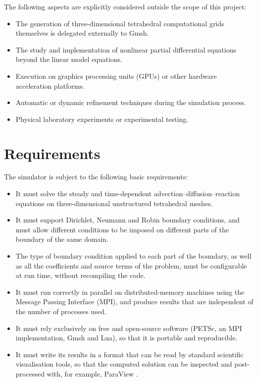 \documentclass[GREVA,english,openany]{tfe-eseiaat}
\begin{document}
The following aspects are explicitly considered outside the scope of this project:

\begin{itemize}
    \item The generation of three-dimensional tetrahedral computational grids themselves is delegated externally to Gmsh.
    \item The study and implementation of nonlinear partial differential equations beyond the linear model equations.
    \item Execution on graphics processing units (GPUs) or other hardware acceleration platforms.
    \item Automatic or dynamic refinement techniques during the simulation process.
    \item Physical laboratory experiments or experimental testing.
\end{itemize}

\chapter{Requirements}

The simulator is subject to the following basic requirements:
\begin{itemize}
    \item It must solve the steady and time-dependent
    advection--diffusion--reaction equations on three-dimensional
    unstructured tetrahedral meshes.

    \item It must support Dirichlet, Neumann and Robin boundary conditions,
    and must allow different conditions to be imposed on different parts of the
    boundary of the same domain.

    \item The type of boundary condition applied to each part of the boundary,
    as well as all the coefficients and source terms of the problem, must be
    configurable at run time, without recompiling the code.

    \item It must run correctly in parallel on distributed-memory machines
    using the Message Passing Interface (MPI), and produce results that are
    independent of the number of processes used.

    \item It must rely exclusively on free and open-source software (PETSc,
    an MPI implementation, Gmsh and Lua), so that it is portable and
    reproducible.

    \item It must write its results in a format that can be read by standard
    scientific visualisation tools, so that the computed solution can be
    inspected and post-processed with, for example, ParaView
    \cite{paraview-guide}.
\end{itemize}
\clearpage
\end{document}
